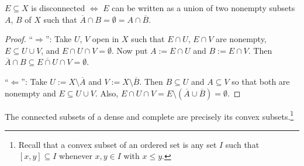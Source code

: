 	\begin{lem}
		$E\subseteq X$ is disconnected $\iff$ $E$ can be written as a union of two nonempty subsets $A$, $B$ of $X$ such that $\overline A\cap B = \emptyset = A\cap\overline B$.
	\end{lem}
	
	\begin{proof}
		``$\Rightarrow$'': Take $U$, $V$ open in $X$ such that $E\cap U$, $E\cap V$ are nonempty, $E\subseteq U\cup V$, and $E\cap U\cap V = \emptyset$. Now put $A := E\cap U$ and $B := E\cap V$. Then $\overline A\cap B\subseteq \overline{E\cap U}\cap V = \emptyset$.
		
		``$\Leftarrow$'': Take $U := X\setminus \overline A$ and $V := X\setminus \overline B$. Then $B\subseteq U$ and $A\subseteq V$ so that both are nonempty and $E\subseteq U\cup V$. Also, $E\cap U\cap V = E\setminus(\overline A\cup\overline B) = \emptyset$.
	\end{proof}
	
	\begin{prp}\label{PRP: linear continua are connected}
		The connected subsets of a dense and complete \LOTS{} are precisely its convex subsets.\footnote{
			Recall that a convex subset of an ordered set is any set $I$ such that $[x, y]\subseteq I$ whenever $x, y\in I$ with $x\le y$.
		}
	\end{prp}
	
